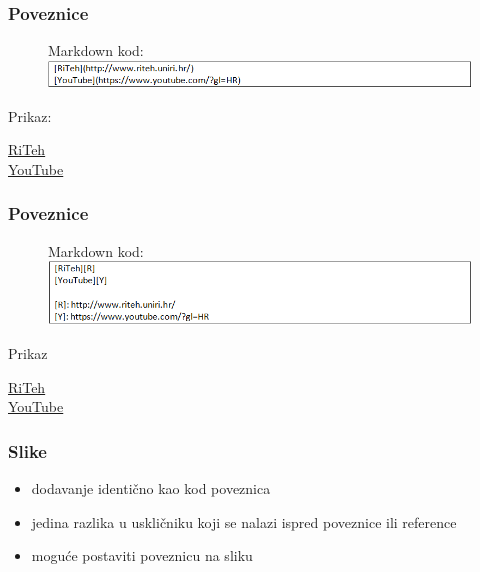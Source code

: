 \documentclass{beamer}
\begin{document}
\newpage

\begin{frame}
\frametitle{Poveznice}
\begin{figure}
{Markdown kod:} 
\includegraphics[width = 1.0\linewidth]{Poveznica1.png}
\end{figure}

\begin{center}
Prikaz:
\end{center}



\href{http://www.riteh.uniri.hr/}{RiTeh} \\
\href{https://www.youtube.com/?gl=HR}{YouTube}
\end{frame}

\newpage

\begin{frame}
\frametitle{Poveznice}
\begin{figure}
{Markdown kod:} 
\includegraphics[width = 1.0\linewidth]{Poveznica2.png}
\end{figure}

\begin{center}
Prikaz
\end{center}



\href{http://www.riteh.uniri.hr/}{RiTeh} \\
\href{https://www.youtube.com/?gl=HR}{YouTube}

\end{frame}

\newpage

\begin{frame}
\frametitle{Slike}
\begin{itemize}
\item dodavanje identično kao kod poveznica
\item jedina razlika u uskličniku koji se nalazi ispred poveznice ili reference
\item moguće postaviti poveznicu na sliku
\end{itemize}
\end{frame}
\end{document}
